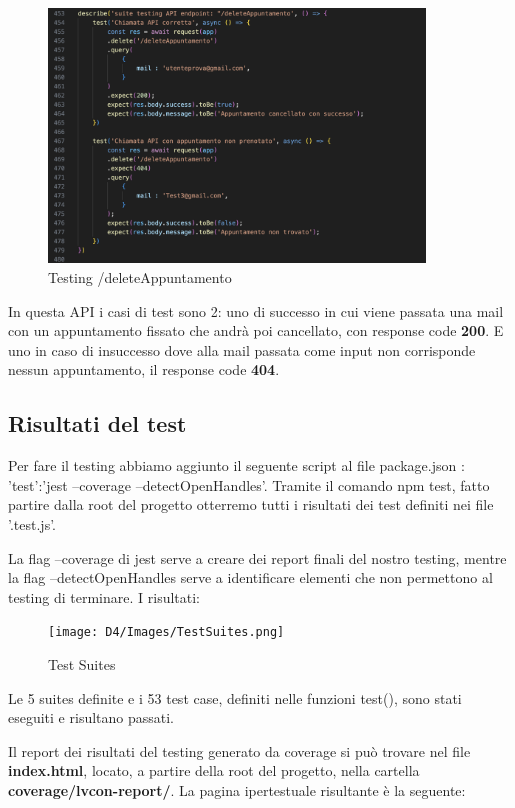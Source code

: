 \documentclass{article}
\begin{document}
\begin{figure}[H]
    \centering
    \includegraphics[width=100mm]{D4/Images/describetest.png}
    \caption{Testing /deleteAppuntamento}
\end{figure}

In questa API i casi di test sono 2: uno di successo in cui viene passata una mail con un appuntamento fissato che andrà poi cancellato, con response code \textbf{200}.
E uno in caso di insuccesso dove alla mail passata come input non corrisponde nessun appuntamento, il response code  \textbf{404}.
\subsection{Risultati del test}
Per fare il testing abbiamo aggiunto il seguente script al file package.json : 'test':'jest --coverage --detectOpenHandles'.
Tramite il comando npm test, fatto partire dalla root del progetto otterremo tutti i risultati dei test definiti nei file '.test.js'.

La flag --coverage di jest serve a creare dei report finali del nostro testing, mentre la flag --detectOpenHandles serve a identificare elementi che non permettono al testing di terminare.
I risultati:

\begin{figure}[H]
    \centering
    \texttt{[image: D4/Images/TestSuites.png]}
    \caption{Test Suites}
\end{figure}

Le 5 suites definite e i 53 test case, definiti nelle funzioni test(), sono stati eseguiti e risultano passati.

Il report dei risultati del testing generato da coverage si può trovare nel file \textbf{index.html}, locato, a partire della root del progetto, nella cartella \textbf{coverage/lvcon-report/}. La pagina ipertestuale risultante è la seguente:
\end{document}
